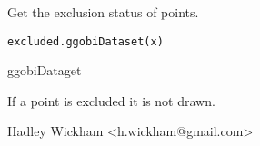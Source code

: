 \documentclass{article}
\begin{document}
\begin{Description}\relax
Get the exclusion status of points.
\end{Description}
\begin{Usage}
\begin{verbatim}excluded.ggobiDataset(x)\end{verbatim}
\end{Usage}
\begin{Arguments}
\begin{ldescription}
\item[\code{x}] ggobiDataget
\end{ldescription}
\end{Arguments}
\begin{Details}\relax
If a point is excluded it is not drawn.
\end{Details}
\begin{Author}\relax
Hadley Wickham <h.wickham@gmail.com>
\end{Author}
\begin{SeeAlso}\relax
{}
\end{SeeAlso}
\begin{Examples}
\begin{ExampleCode}\end{ExampleCode}
\end{Examples}
\end{document}
